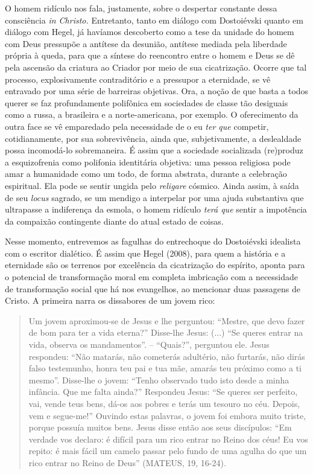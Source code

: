 O homem ridículo nos fala, justamente, sobre o despertar constante dessa
consciência \emph{in Christo.} Entretanto, tanto em diálogo com
Dostoiévski quanto em diálogo com Hegel, já havíamos descoberto como a
tese da unidade do homem com Deus pressupõe a antítese da desunião,
antítese mediada pela liberdade própria à queda, para que a síntese do
reencontro entre o homem e Deus se dê pela ascensão da criatura ao
Criador por meio de sua cicatrização. Ocorre que tal processo,
explosivamente contraditório e a pressupor a eternidade, se vê entravado
por uma série de barreiras objetivas. Ora, a noção de que basta a todos
querer se faz profundamente polifônica em sociedades de classe tão
desiguais como a russa, a brasileira e a norte-americana, por exemplo. O
oferecimento da outra face se vê emparedado pela necessidade de o eu
\emph{ter que} competir, cotidianamente, por sua sobrevivência, ainda
que, subjetivamente, a deslealdade possa incomodá-lo sobremaneira. É
assim que a sociedade socializada (re)produz a esquizofrenia como
polifonia identitária objetiva: uma pessoa religiosa pode amar a
humanidade como um todo, de forma abstrata, durante a celebração
espiritual. Ela pode se sentir ungida pelo \emph{religare} cósmico.
Ainda assim, à saída de seu \emph{locus} sagrado, se um mendigo a
interpelar por uma ajuda substantiva que ultrapasse a indiferença da
esmola, o homem ridículo \emph{terá que} sentir a impotência da
compaixão contingente diante do atual estado de coisas.

Nesse momento, entrevemos as fagulhas do entrechoque do Dostoiévski
idealista com o escritor dialético. É assim que Hegel (2008), para quem
a história e a eternidade são os terrenos por excelência da cicatrização
do espírito, aponta para o potencial de transformação moral em completa
imbricação com a necessidade de transformação social que há nos
evangelhos, ao mencionar duas passagens de Cristo. A primeira narra os
dissabores de um jovem rico:

\begin{quote}
Um jovem aproximou-se de Jesus e lhe perguntou: ``Mestre, que devo fazer
de bom para ter a vida eterna?'' Disse-lhe Jesus: (...) ``Se queres
entrar na vida, observa os mandamentos''. -- ``Quais?'', perguntou ele.
Jesus respondeu: ``Não matarás, não cometerás adultério, não furtarás,
não dirás falso testemunho, honra teu pai e tua mãe, amarás teu próximo
como a ti mesmo''. Disse-lhe o jovem: ``Tenho observado tudo isto desde
a minha infância. Que me falta ainda?'' Respondeu Jesus: ``Se queres ser
perfeito, vai, vende teus bens, dá-os aos pobres e terás um tesouro no
céu. Depois, vem e segue-me!'' Ouvindo estas palavras, o jovem foi
embora muito triste, porque possuía muitos bens. Jesus disse então aos
seus discípulos: ``Em verdade vos declaro: é difícil para um rico entrar
no Reino dos céus! Eu vos repito: é mais fácil um camelo passar pelo
fundo de uma agulha do que um rico entrar no Reino de Deus'' (MATEUS,
19, 16-24).
\end{quote}

